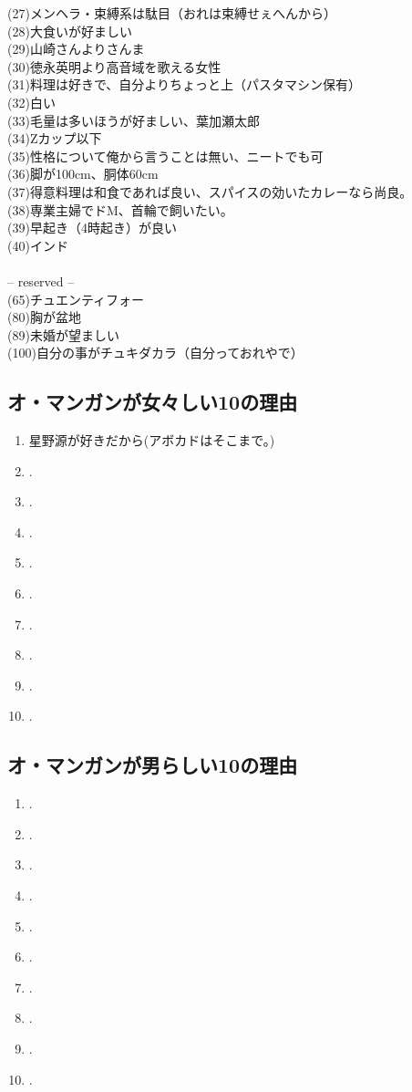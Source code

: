 \documentclass[12pt]{jsarticle}
\begin{document}
(27)メンヘラ・束縛系は駄目（おれは束縛せぇへんから）\\
(28)大食いが好ましい\\
(29)山崎さんよりさんま\\
(30)徳永英明より高音域を歌える女性\\
(31)料理は好きで、自分よりちょっと上（パスタマシン保有）\\
(32)白い\\
(33)毛量は多いほうが好ましい、葉加瀬太郎\\
(34)Zカップ以下\\
(35)性格について俺から言うことは無い、ニートでも可\\
(36)脚が100cm、胴体60cm\\
(37)得意料理は和食であれば良い、スパイスの効いたカレーなら尚良。\\
(38)専業主婦でドM、首輪で飼いたい。\\
(39)早起き（4時起き）が良い\\
(40)インド\\
\\
-- reserved --\\ 
(65)チュエンティフォー\\
(80)胸が盆地\\
(89)未婚が望ましい\\
(100)自分の事がチュキダカラ（自分っておれやで）\\

\newpage
\subsection{オ・マンガンが女々しい10の理由}
\begin{enumerate}
\item 星野源が好きだから(アボカドはそこまで。)
\item .
\item .
\item .
\item .
\item .
\item .
\item .
\item .
\item .
\end{enumerate}


\subsection{オ・マンガンが男らしい10の理由}
\begin{enumerate}
\item .
\item .
\item .
\item .
\item .
\item .
\item .
\item .
\item .
\item .
\end{enumerate}
\end{document}
